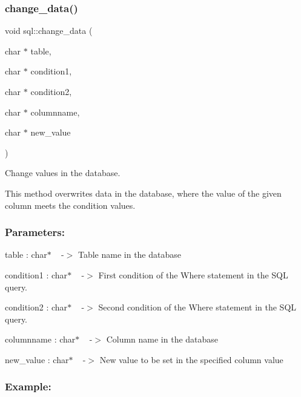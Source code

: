 \mbox{\label{classsql_aa6a8501373e0cd73d48bee389353d6ea}} 
\subsubsection{\texorpdfstring{change\+\_\+data()}{change\_data()}}
{\footnotesize\ttfamily void sql\+::change\+\_\+data (\begin{DoxyParamCaption}\item[{char $\ast$}]{table,  }\item[{char $\ast$}]{condition1,  }\item[{char $\ast$}]{condition2,  }\item[{char $\ast$}]{columnname,  }\item[{char $\ast$}]{new\+\_\+value }\end{DoxyParamCaption})}



Change values in the database. 

This method overwrites data in the database, where the value of the given column meets the condition values.

\subsubsection*{Parameters\+: }

table \+: char$\ast$ ~\newline
-\/$>$ Table name in the database

condition1 \+: char$\ast$ ~\newline
-\/$>$ First condition of the Where statement in the S\+QL query.

condition2 \+: char$\ast$ ~\newline
-\/$>$ Second condition of the Where statement in the S\+QL query.

columnname \+: char$\ast$ ~\newline
-\/$>$ Column name in the database

new\+\_\+value \+: char$\ast$ ~\newline
-\/$>$ New value to be set in the specified column value

\subsubsection*{Example\+: }


